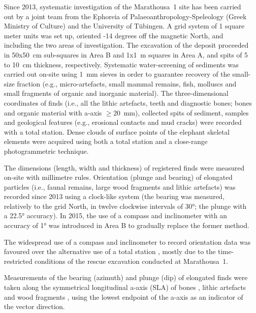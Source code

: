 \documentclass[preprint,authoryear,times]{elsarticle} %
\begin{document}
Since 2013, systematic investigation of the Marathousa~1 site has been carried out by a joint team from the Ephoreia of Palaeoanthropology-Speleology (Greek Ministry of Culture) and the University of Tübingen. A grid system of 1 square meter units was set up, oriented -14 degrees off the magnetic North, and including the two areas of investigation. The excavation of the deposit proceeded in 50x50~cm sub-squares in Area B and 1x1~m squares in Area A, and spits of 5 to 10~cm thickness, respectively. Systematic water-screening of sediments was carried out on-site using 1~mm sieves in order to guarantee recovery of the small-size fraction (e.g., micro-artefacts, small mammal remains, fish, molluscs and small fragments of organic and inorganic material). The three-dimensional coordinates of finds (i.e., all the lithic artefacts, teeth and diagnostic bones; bones and organic material with a-axis $\geq20$~mm), collected spits of sediment, samples and geological features (e.g., erosional contacts and mud cracks) were recorded with a total station. Dense clouds of surface points of the elephant skeletal elements were acquired using both a total station and a close-range photogrammetric technique.

The dimensions (length, width and thickness) of registered finds were measured on-site with millimetre rules. Orientation (plunge and bearing) of elongated particles (i.e., faunal remains, large wood fragments and lithic artefacts) was recorded since 2013 using a clock-like system (the bearing was measured, relatively to the grid North, in twelve clockwise intervals of 30°; the plunge with a 22.5° accuracy). In 2015, the use of a compass and inclinometer with an accuracy of 1° was introduced in Area B to gradually replace the former method.

The widespread use of a compass and inclinometer to record orientation data \citep[][among others]{Voorhies1969,Fiorillo1991,Bertran1995,Bertran1997,Lenoble2004,Eberth2007,Eren2010,Benito-Calvo2011a,Dominguez-Rodrigo2012,Dominguez-Rodrigo2013,Dominguez-Rodrigo2014,Cobo-Sanchez2014,Organista2017} was favoured over the alternative use of a total station \citep[][among others]{Kluskens1990,Dibble1997,McPherron2005,Enloe2006,Bernatchez2010}, mostly due to the time-restricted conditions of the rescue excavation conducted at Marathousa~1.

Measurements of the bearing (azimuth) and plunge (dip) of elongated finds were taken along the symmetrical longitudinal a-axis (SLA) of bones \citep{Dominguez-Rodrigo2013}, lithic artefacts \citep{Bertran1995} and wood fragments \citep{Macdonald1985}, using the lowest endpoint of the a-axis as an indicator of the vector direction.
\end{document}
